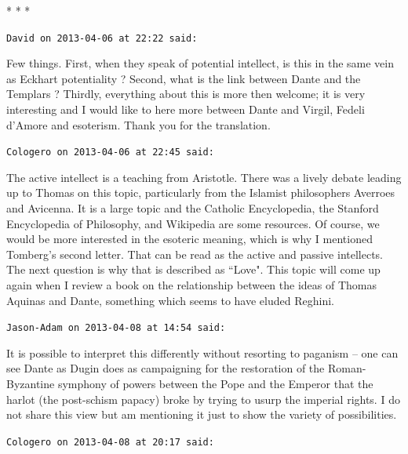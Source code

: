\hfill




\begin{center}* * *\end{center}

\begin{footnotesize}\begin{sffamily}



\texttt{David on 2013-04-06 at 22:22 said: }

Few things. First, when they speak of potential intellect, is this in the same vein as Eckhart potentiality ? Second, what is the link between Dante and the Templars ? Thirdly, everything about this is more then welcome; it is very interesting and I would like to here more between Dante and Virgil, Fedeli d'Amore and esoterism. Thank you for the translation.


\hfill

\texttt{Cologero on 2013-04-06 at 22:45 said: }

The active intellect is a teaching from Aristotle. There was a lively debate leading up to Thomas on this topic, particularly from the Islamist philosophers Averroes and Avicenna. It is a large topic and the Catholic Encyclopedia, the Stanford Encyclopedia of Philosophy, and Wikipedia are some resources. Of course, we would be more interested in the esoteric meaning, which is why I mentioned Tomberg's second letter. That can be read as the active and passive intellects. The next question is why that is described as ``Love". This topic will come up again when I review a book on the relationship between the ideas of Thomas Aquinas and Dante, something which seems to have eluded Reghini.


\hfill

\texttt{Jason-Adam on 2013-04-08 at 14:54 said: }

It is possible to interpret this differently without resorting to paganism – one can see Dante as Dugin does as campaigning for the restoration of the Roman-Byzantine symphony of powers between the Pope and the Emperor that the harlot (the post-schism papacy) broke by trying to usurp the imperial rights. I do not share this view but am mentioning it just to show the variety of possibilities.


\hfill

\texttt{Cologero on 2013-04-08 at 20:17 said: }


\end{sffamily}
\end{footnotesize}
